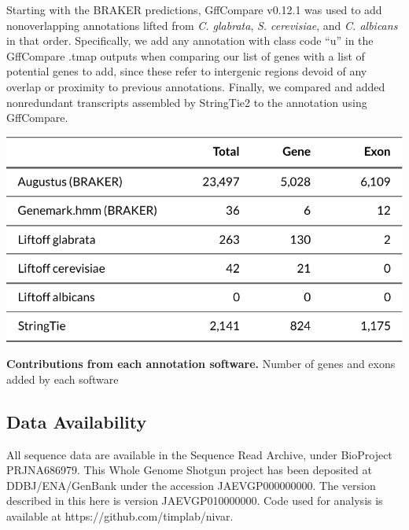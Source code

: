 Starting with the BRAKER predictions, GffCompare v0.12.1 \citep{Pertea2020-lw} was used to add nonoverlapping annotations lifted from \textit{C. glabrata}, \textit{S. cerevisiae}, and \textit{C. albicans} in that order. Specifically, we add any annotation with class code “u” in the GffCompare .tmap outputs when comparing our list of genes with a list of potential genes to add, since these refer to intergenic regions devoid of any overlap or proximity to previous annotations. Finally, we compared and added nonredundant transcripts assembled by StringTie2 to the annotation using GffCompare.

\begin{table}[!ht]
\centering
\includegraphics[width = .75\linewidth,keepaspectratio]{figure/genecounttable.pdf}
\caption[Contributions from each annotation software]{{\bf Contributions from each annotation software.} Number of genes and exons added by each software }
\label{tab:genecounttable}
\end{table}


\subsection{Data Availability}
\label{sec:methods}

All sequence data are available in the Sequence Read Archive, under BioProject PRJNA686979. This Whole Genome Shotgun project has been deposited at DDBJ/ENA/GenBank under the accession JAEVGP000000000. The version described in this here is version JAEVGP010000000. Code used for analysis is available at https://github.com/timplab/nivar.
